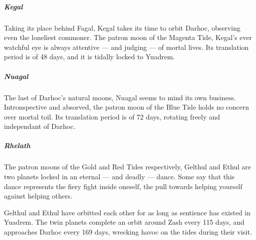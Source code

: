 \subparagraph{Kegal} Taking its place behind Fagal, Kegal takes its time to orbit Darhoc, observing even the loneliest commoner.
The patron moon of the Magenta Tide, Kegal's ever watchful eye is always attentive --- and judging --- of mortal lives.
Its translation period is of 48 days, and it is tidally locked to Yuadrem.

\subparagraph{Nuagal} The last of Darhoc's natural moons, Nuagal seems to mind its own business.
Intronspective and absorved, the patron moon of the Blue Tide holds no concern over mortal toil.
Its translation period is of 72 days, rotating freely and independant of Darhoc.

\subparagraph{Rhelath} The patron moons of the Gold and Red Tides respectively, Gelthul and Ethul are two planets locked in an eternal --- and deadly --- dance.
Some say that this dance represents the fiery fight inside oneself, the pull towards helping yourself against helping others.

Gelthul and Ethul have orbitted each other for as long as sentience has existed in Yuadrem.%
The twin planets complete an orbit around Zash every 115 days, and approaches Darhoc every 169 days, wrecking havoc on the tides during their visit.
